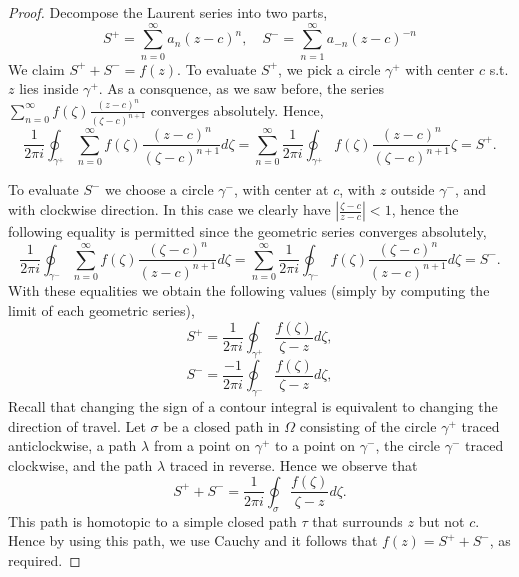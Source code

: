  \begin{proof}
   Decompose the Laurent series into two parts, 
   \[S^+=\sum_{n=0}^{\infty} a_n(z-c)^n, \quad S^-= \sum_{n=1}^{\infty} a_{-n}
   (z-c)^{-n}\]
   We claim $S^{+}+S^{-}=f(z)$. To evaluate $S^{+}$, we pick a circle $\gamma^+$
   with center $c$ s.t. $z$ lies inside $\gamma^+$. As a consquence, as we saw
   before, the series $\sum_{n=0}^{\infty}
   f(\zeta)\frac{(z-c)^n}{(\zeta-c)^{n+1}}$ converges absolutely. Hence, 
   \[\frac{1}{2\pi i} \oint_{\gamma^+} \sum_{n=0}^{\infty} f(\zeta)
   \frac{(z-c)^{n}}{(\zeta -c)^{n+1}} d\zeta = \sum_{n=0}^{\infty}
   \frac{1}{2\pi i} \oint_{\gamma^+}
   f(\zeta)\frac{(z-c)^{n}}{(\zeta-c)^{n+1}}\zeta = S^+.\]

   To evaluate $S^{-}$ we choose a circle $\gamma^-$, with center at $c$,
   with $z$ outside $\gamma^-$, and with clockwise direction. In this case we
   clearly have $|\frac{\zeta-c}{z-c}|<1$, hence the following equality is
   permitted since the geometric series converges absolutely,
   \[\frac{1}{2\pi i}\oint_{\gamma^-}\sum_{n=0}^{\infty} f(\zeta)
     \frac{(\zeta-c)^{n}}{(z-c)^{n+1}}d\zeta = \sum_{n=0}^{\infty}
   \frac{1}{2\pi i} \oint_{\gamma^-}
   f(\zeta)\frac{(\zeta-c)^n}{(z-c)^{n+1}}d\zeta = S^-.\]
   With these equalities we obtain the following values (simply by computing the
   limit of each geometric series),
   \[S^{+} = \frac{1}{2\pi i} \oint_{\gamma^+} \frac{f(\zeta)}{\zeta-z}d\zeta,\]
   \[S^{-} = \frac{-1}{2\pi i} \oint_{\gamma^-} \frac{f(\zeta)}{\zeta-z}d\zeta,\]
   Recall that changing the sign of a contour integral is equivalent to changing
   the direction of travel. Let $\sigma$ be a closed path in $\Omega$ consisting
   of the circle $\gamma^+$ traced anticlockwise, a path $\lambda$ from a point
   on $\gamma^+$ to a point on $\gamma^-$, the circle $\gamma^-$ traced
   clockwise, and the path $\lambda$ traced in reverse. Hence we observe that 
   \[S^+ + S^- = \frac{1}{2\pi i} \oint_{\sigma}\frac{f(\zeta)}{\zeta-z} d\zeta.\]
   This path is homotopic to a simple closed path $\tau$ that surrounds $z$  but
   not $c$. Hence by using this path, we use Cauchy and it follows that
   $f(z)=S^+ + S^-$, as required.
 \end{proof}
